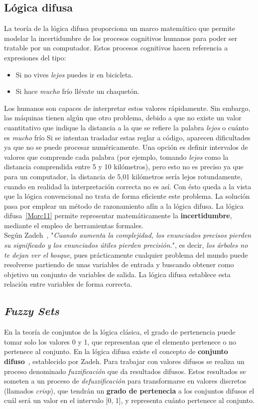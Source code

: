 \subsection{Lógica difusa}
La teoría de la lógica difusa proporciona un marco matemático que permite modelar la incertidumbre de los procesos cognitivos humanos para poder ser tratable por un computador. Estos procesos cognitivos hacen referencia a expresiones del tipo:
\begin{itemize}
	\item Si no vives \textit{lejos} puedes ir en bicicleta.
	\item Si hace \textit{mucho} frío llévate un chaquetón.
\end{itemize}
Los humanos son capaces de interpretar estos valores rápidamente. Sin embargo, las máquinas tienen algún que otro problema, debido a que no existe un valor cuantitativo que indique la distancia a la que se refiere la palabra \textit{lejos} o cuánto es \textit{mucho} frío Si se intentan trasladar estas reglar a código, aparecen dificultades ya que no se puede procesar numéricamente. Una opción es definir intervalos de valores que comprende cada palabra (por ejemplo, tomando \textit{lejos} como la distancia comprendida entre 5 y 10 kilómetros), pero esto no es preciso ya que para un computador, la distancia de 5,01 kilómetros sería lejos rotundamente, cuando en realidad la interpretación correcta no es así. Con ésto queda a la vista que la lógica convencional no trata de forma eficiente este problema. La solución pasa por emplear un método de razonamiento afín a la lógica difusa. La lógica difusa~\ref{Morc11} permite representar matemáticamente la \textbf{incertidumbre}, mediante el empleo de herramientas formales.\\

Según Zadeh~\cite{Zad73}, "\textit{Cuando aumenta la complejidad, los enunciados precisos pierden su significado y los enunciados útiles pierden precisión.}", es decir, \textit{los árboles no te dejan ver el bosque}, pues prácticamente cualquier problema del mundo puede resolverse partiendo de unas variables de entrada y buscando obtener como objetivo un conjunto de variables de salida. La lógica difusa establece esta relación entre variables de forma correcta.

\subsection{\textit{Fuzzy Sets}}
En la teoría de conjuntos de la lógica clásica, el grado de pertenencia puede tomar solo los valores 0 y 1, que representan que el elemento pertenece o no pertenece al conjunto. En la lógica difusa existe el concepto de \textbf{conjunto difuso}~\cite{Zad65}, establecido por Zadeh. Para trabajar con valores difusos se realiza un proceso denominado \textit{fuzzificación} que da resultados difusos. Estos resultados se someten a un proceso de \textit{defuzzificación} para transformarse en valores discretos (llamados \textit{crisp}), que tendrán un \textbf{grado de pertenecia} a los conjuntos difusos el cuál será un valor en el intervalo [0, 1], y representa cuánto pertenece al conjunto.\\

